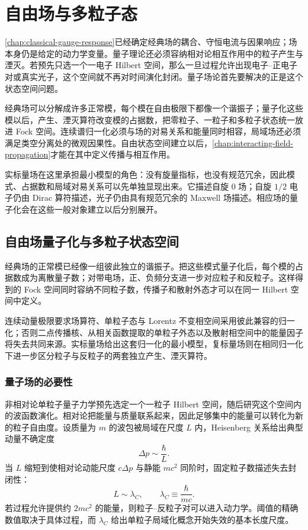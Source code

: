 \chapter{自由场与多粒子态}\label{chap:qft-foundations}

\cref{chap:classical-gauge-response}已经确定经典场的耦合、守恒电流与因果响应；场本身仍是给定的动力学变量。量子理论还必须容纳相对论相互作用中的粒子产生与湮灭。若预先只选一个一电子 Hilbert 空间，那么一旦过程允许出现电子--正电子对或真实光子，这个空间就不再对时间演化封闭。量子场论首先要解决的正是这个状态空间问题。

经典场可以分解成许多正常模，每个模在自由极限下都像一个谐振子；量子化这些模以后，产生、湮灭算符改变模的占据数，把零粒子、一粒子和多粒子状态统一放进 Fock 空间。连续谱归一化必须与场的对易关系和能量同时相容，局域场还必须满足类空分离处的微观因果性。自由状态空间建立以后，\cref{chap:interacting-field-propagation}才能在其中定义传播与相互作用。

实标量场在这里承担最小模型的角色：没有旋量指标，也没有规范冗余，因此模式、占据数和局域对易关系可以先单独显现出来。它描述自旋 $0$ 场；自旋 $1/2$ 电子仍由 Dirac 算符描述，光子仍由具有规范冗余的 Maxwell 场描述。相应场的量子化会在这些一般对象建立以后分别展开。

\section{自由场量子化与多粒子状态空间}

经典场的正常模已经像一组彼此独立的谐振子。把这些模式量子化后，每个模的占据数成为离散量子数；对带电场，正、负频分支进一步对应粒子和反粒子。这样得到的 Fock 空间同时容纳不同粒子数，传播子和散射外态才可以在同一 Hilbert 空间中定义。

连续动量极限要求场算符、单粒子态与 Lorentz 不变相空间采用彼此兼容的归一化；否则二点传播核、从相关函数提取的单粒子外态以及散射相空间中的能量因子将失去共同来源。实标量场给出这套归一化的最小模型，复标量场则在相同归一化下进一步区分粒子与反粒子的两套独立产生、湮灭算符。

\subsection{量子场的必要性}

非相对论单粒子量子力学预先选定一个一粒子 Hilbert 空间，随后研究这个空间内的波函数演化。相对论把能量与质量联系起来，因此足够集中的能量可以转化为新的粒子自由度。设质量为 $m$ 的波包被局域在尺度 $L$ 内，Heisenberg 关系给出典型动量不确定度
\begin{equation*}
 \Delta p\sim \frac{\hbar}{L}.
\end{equation*}
当 $L$ 缩短到使相对论动能尺度 $c\Delta p$ 与静能 $mc^2$ 同阶时，固定粒子数描述失去封闭性：
\begin{equation}
 L\sim \lambda_C,
 \qquad
 \lambda_C\equiv\frac{\hbar}{mc}.
 \label{eq:qft-compton-scale}
\end{equation}
若过程允许提供约 $2mc^2$ 的能量，则粒子--反粒子对可以进入动力学。阈值的精确数值取决于具体过程，而 $\lambda_C$ 给出单粒子局域化概念开始失效的基本长度尺度。

